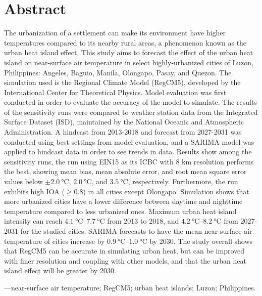 \chapter*{Abstract}

The urbanization of a settlement can make its environment have higher temperatures compared to its nearby rural areas,
	a phenomenon known as the urban heat island effect.
This study aims to forecast the effect of the urban heat island on near-surface air temperature in select highly-urbanized cities of Luzon, Philippines: Angeles, Baguio, Manila, Olongapo, Pasay, and Quezon.
The simulation used is the Regional Climate Model (RegCM5), developed by the International Center for Theoretical Physics.
Model evaluation was first conducted in order to evaluate the accuracy of the model to simulate.
The results of the sensitivity runs were compared to weather station data from the Integrated Surface Dataset (ISD), maintained by the National Oceanic and Atmospheric Administration.
A hindcast from 2013-2018 and forecast from 2027-2031 was conducted using best settings from model evaluation, and a SARIMA model was applied to hindcast data in order to see trends in data.
Results show among the sensitivity runs, the run using EIN15 as its ICBC with 8 km resolution performs the best, showing mean bias, mean absolute error, and root mean square error values below $\pm \qty{2.0}{\degreeCelsius}$, $\qty{2.0}{\degreeCelsius}$, and $\qty{3.5}{\degreeCelsius}$, respectively.
Furthermore, the run exhibits high IOA ($\geq \num{0.8}$) in all cities except Olongapo.
Simulation shows that more urbanized cities have a lower difference between daytime and nighttime temperature compared to less urbanized ones.
Maximum urban heat island intensity can reach 
$\qtyrange{4.1}{7.7}{\degreeCelsius}$ from 2013 to 2018, and
$\qtyrange{4.2}{8.2}{\degreeCelsius}$ from 2027-2031 for the studied cities.
SARIMA forecasts to have the mean near-surface air temperature of cities increase by $\qtyrange{0.9}{1.0}{\degreeCelsius}$ by 2030.
The study overall shows that RegCM5 can be accurate in simulating urban heat, but can be improved with finer resolution and coupling with other models, and that 
the urban heat island effect will be greater by 2030.

\vspace{3ex} ---near-surface air temperature; RegCM5; urban heat islands; Luzon; Philippines.

%

